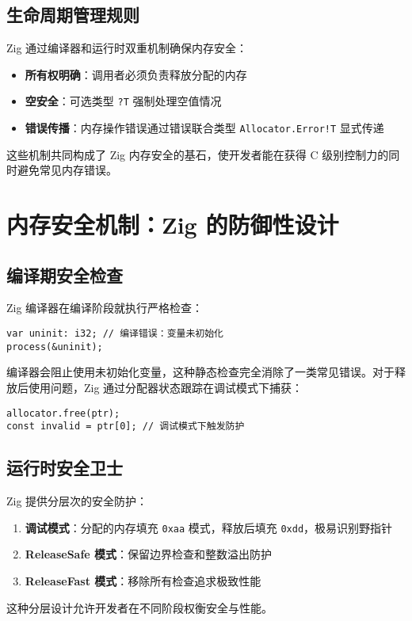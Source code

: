 \section{生命周期管理规则}
Zig 通过编译器和运行时双重机制确保内存安全：\par
\begin{itemize}
\item \textbf{所有权明确}：调用者必须负责释放分配的内存
\item \textbf{空安全}：可选类型 \texttt{?T} 强制处理空值情况
\item \textbf{错误传播}：内存操作错误通过错误联合类型 \texttt{Allocator.Error!T} 显式传递
\end{itemize}
这些机制共同构成了 Zig 内存安全的基石，使开发者能在获得 C 级别控制力的同时避免常见内存错误。\par
\chapter{内存安全机制：Zig 的防御性设计}
\section{编译期安全检查}
Zig 编译器在编译阶段就执行严格检查：\par
\begin{lstlisting}[language=zig]
var uninit: i32; // 编译错误：变量未初始化
process(&uninit);
\end{lstlisting}
编译器会阻止使用未初始化变量，这种静态检查完全消除了一类常见错误。对于释放后使用问题，Zig 通过分配器状态跟踪在调试模式下捕获：\par
\begin{lstlisting}[language=zig]
allocator.free(ptr);
const invalid = ptr[0]; // 调试模式下触发防护
\end{lstlisting}
\section{运行时安全卫士}
Zig 提供分层次的安全防护：\par
\begin{enumerate}
\item \textbf{调试模式}：分配的内存填充 \texttt{0xaa} 模式，释放后填充 \texttt{0xdd}，极易识别野指针
\item \textbf{ReleaseSafe 模式}：保留边界检查和整数溢出防护
\item \textbf{ReleaseFast 模式}：移除所有检查追求极致性能
\end{enumerate}
这种分层设计允许开发者在不同阶段权衡安全与性能。\par
